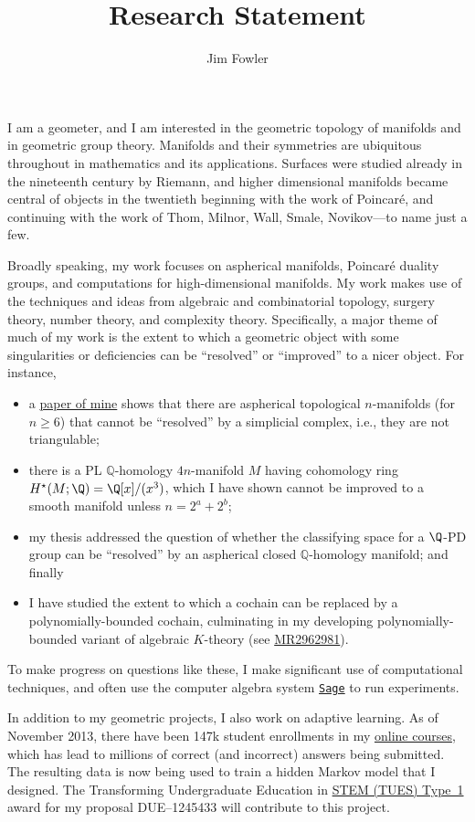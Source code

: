 \documentclass[12pt]{amsart}
\title{Research Statement}
\author{Jim Fowler}
\begin{document}
\maketitle

I am a geometer, and I am interested in the geometric topology of
manifolds and in geometric group theory.  Manifolds and their
symmetries are ubiquitous throughout in mathematics and its
applications.  Surfaces were studied already in the nineteenth century
by Riemann, and higher dimensional manifolds became central of objects
in the twentieth beginning with the work of Poincar\'e, and continuing
with the work of Thom, Milnor, Wall, Smale, Novikov---to name just a
few.

Broadly speaking, my work focuses on aspherical manifolds, Poincar\'e
duality groups, and computations for high-dimensional manifolds.  My
work makes use of the techniques and ideas from algebraic and
combinatorial topology, surgery theory, number theory, and complexity
theory.  Specifically, a major theme of much of my work is the extent
to which a geometric object with some singularities or deficiencies
can be ``resolved'' or ``improved'' to a nicer object.  For instance,

\begin{itemize}
\item a \href{http://arxiv.org/abs/1304.3730}{paper of mine}
  shows that there are aspherical topological $n$-manifolds (for $n
  \geq 6$) that cannot be ``resolved'' by a simplicial complex, i.e.,
  they are not triangulable;
\item there is a PL $\mathbb{Q}$-homology $4n$-manifold $M$ having
  cohomology ring $H^\star(M;\Q) = \Q[x]/(x^3)$, which I have shown
  cannot be improved to a smooth manifold unless $n = 2^a + 2^b$;
\item my thesis addressed the question of whether the classifying
  space for a $\Q$-PD group can be ``resolved'' by an aspherical
  closed $\mathbb{Q}$-homology manifold; and finally
\item I have studied the extent to which a cochain can be replaced by
  a polynomially-bounded cochain, culminating in my developing
  polynomially-bounded variant of algebraic $K$-theory (see
  \href{http://www.ams.org/mathscinet-getitem?mr=2962981}{MR2962981}).
\end{itemize}

To make progress on questions like these, I make significant use of
computational techniques, and often use the computer algebra system
\href{http://sagemath.org/}{\texttt{Sage}} to run experiments.  

In addition to my geometric projects, I also work on adaptive
learning.  As of November 2013, there have been 147k student
enrollments in my \href{http://kisonecat.com/teaching/2014/calculus-two/}{online courses}, which has lead to millions of correct (and incorrect)
answers being submitted.  The resulting data is now being used to
train a hidden Markov model that I designed.  The Transforming
Undergraduate Education in \href{http://www.nsf.gov/funding/pgm_summ.jsp?pims_id=5741}{STEM (TUES) Type~1} award for my proposal
DUE--1245433 will contribute to this project.
\end{document}
